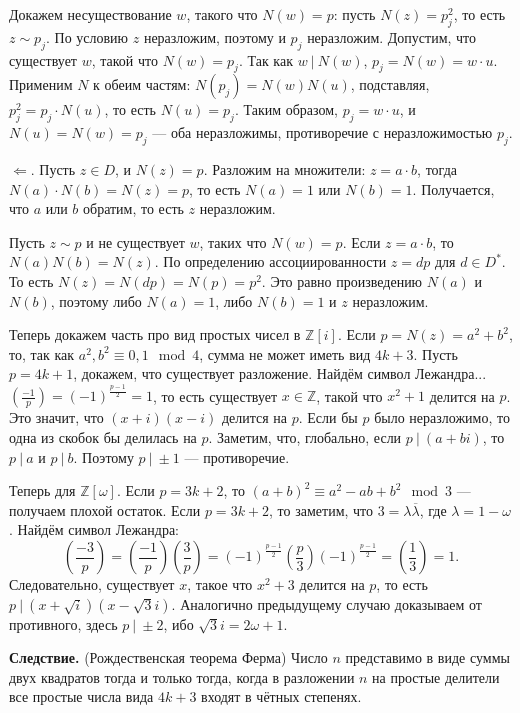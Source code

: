 Докажем несуществование $w$, такого что $N(w) = p$: пусть $N(z) = p_j^2$, то есть $z \sim p_j$.
По условию $z$ неразложим, поэтому и $p_j$ неразложим.
Допустим, что существует $w$, такой что $N(w) = p_j$.
Так как $w~|~N(w)$, $p_j = N(w) = w \cdot u$.
Применим $N$ к обеим частям: $N(p_j) = N(w) N(u)$, подставляя, $p_j^2 = p_j \cdot N(u)$, то есть $N(u) = p_j$.
Таким образом, $p_j = w \cdot u$, и $N(u) = N(w) = p_j$ --- оба неразложимы, противоречие с неразложимостью $p_j$.

$\Leftarrow$. Пусть $z \in D$, и $N(z) = p$.
Разложим на множители: $z = a \cdot b$, тогда $N(a) \cdot N(b) = N(z) = p$, то есть $N(a) = 1$ или $N(b) = 1$.
Получается, что $a$ или $b$ обратим, то есть $z$ неразложим.

Пусть $z \sim p$ и не существует $w$, таких что $N(w) = p$.
Если $z = a \cdot b$, то $N(a)N(b) = N(z)$.
По определению ассоциированности $z = dp$ для $d \in D^*$.
То есть $N(z) = N(dp) = N(p) = p^2$.
Это равно произведению $N(a)$ и $N(b)$, поэтому либо $N(a) = 1$, либо $N(b) = 1$ и $z$ неразложим.

Теперь докажем часть про вид простых чисел в $\mathbb Z[i]$.
Если $p = N(z) = a^2 + b^2$, то, так как $a^2, b^2 \equiv 0, 1 \mod 4$, сумма не может иметь вид $4k + 3$.
Пусть $p = 4k + 1$, докажем, что существует разложение.
Найдём символ Лежандра... $\left( \frac{-1}{p} \right) = (-1)^{\frac{p-1}{2}} = 1$, то есть существует $x \in \mathbb Z$, такой что $x^2 + 1$ делится на $p$.
Это значит, что $(x + i)(x - i)$ делится на $p$.
Если бы $p$ было неразложимо, то одна из скобок бы делилась на $p$.
Заметим, что, глобально, если $p~|~(a + bi)$, то $p~|~a$ и $p~|~b$.
Поэтому $p~|~\pm 1$ --- противоречие.

Теперь для $\mathbb Z[\omega]$. Если $p = 3k + 2$, то $(a + b)^2 \equiv a^2 - ab + b^2 \mod 3$ --- получаем плохой остаток.
Если $p = 3k + 2$, то заметим, что $3 = \lambda \overline \lambda$, где $\lambda = 1 - \omega$.
Найдём символ Лежандра:
\[
    \left( \frac{-3}{p} \right) = \left( \frac{-1}{p} \right) \left( \frac{3}{p} \right) = (-1)^{\frac{p-1}{2}} \left( \frac{p}{3} \right) (-1)^{\frac{p-1}{2}} = \left(\frac{1}{3} \right) = 1.
\]
Следовательно, существует $x$, такое что $x^2 + 3$ делится на $p$, то есть $p~|~(x + \sqrt i)(x - \sqrt 3i)$.
Аналогично предыдущему случаю доказываем от противного, здесь $p~|~\pm 2$, ибо $\sqrt 3i = 2\omega + 1$.

\QED

\textbf{Следствие.} (Рождественская теорема Ферма) Число $n$ представимо в виде суммы двух квадратов тогда и только тогда, когда в разложении $n$ на простые делители все простые числа вида $4k + 3$ входят в чётных степенях.

